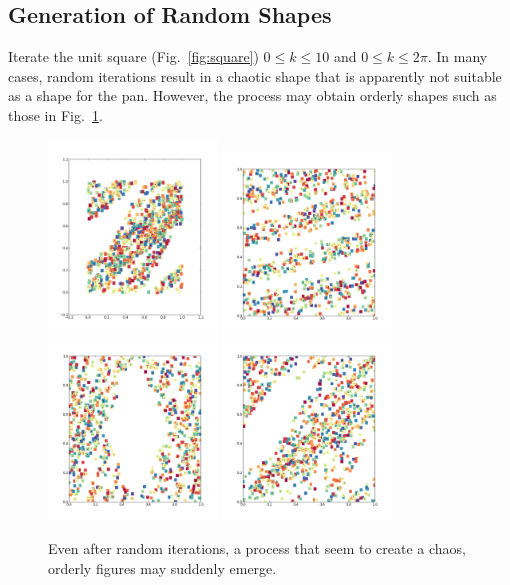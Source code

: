 \documentclass[12pt]{reedmcm}
\begin{document}
\subsection{Generation of Random Shapes}
Iterate the unit square (Fig.~\ref{fig:square}) $0 \leq k \leq 10$ and $0 \leq k \leq 2\pi$.
In many cases, random iterations result in a chaotic shape that is apparently not suitable as a shape for the pan. 
However, the process may obtain orderly shapes such as those in Fig.~\ref{fig:order}.
\begin{figure}[t]
  \centering
  \includegraphics[width=0.4\textwidth]{random2}
  \includegraphics[width=0.4\textwidth]{random128}
  \includegraphics[width=0.4\textwidth]{random256}
  \includegraphics[width=0.4\textwidth]{random1280}
  \caption{Even after random iterations, a process that seem to create a chaos, orderly figures may suddenly emerge.}
  \label{fig:order}
\end{figure}
\end{document}
